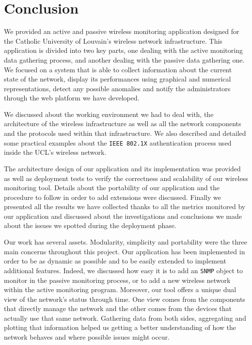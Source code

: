 
\chapter{Conclusion} %

\label{Chapter 7} %


We provided an active and passive wireless monitoring application designed for the Catholic University of Louvain's wireless network infrastructure. This application is divided into two key parts, one dealing with the active monitoring data gathering process, and another dealing with the passive data gathering one. We focused on a system that is able to collect information about the current state of the network, display its performances using graphical and numerical representations, detect any possible anomalies and notify the administrators through the web platform we have developed.

We discussed about the working environment we had to deal with, the architecture of the wireless infrastructure as well as all the network components and the protocols used within that infrastructure. We also described and detailed some practical examples about the \texttt{IEEE 802.1X} authentication process used inside the UCL's wireless network.

The architecture design of our application and its implementation was provided as well as deployment tests to verify the correctness and scalability of our wireless monitoring tool. Details about the portability of our application and the procedure to follow in order to add extensions were discussed.  Finally we presented all the results we have collected thanks to all the metrics monitored by our application and discussed about the investigations and conclusions we made about the issues we spotted during the deployment phase.

Our work has several assets. Modularity, simplicity and portability were the three main concerns throughout this project. Our application has been implemented in order to be as dynamic as possible and to be easily extended to implement additional features. Indeed, we discussed how easy it is to add an \texttt{SNMP} object to monitor in the passive monitoring process, or to add a new wireless network within the active monitoring program. Moreover, our tool offers a unique dual view of the network's status through time. One view comes from the components that directly manage the network and the other comes from the devices that actually use that same network. Gathering data from both sides, aggregating and plotting that information helped us getting a better understanding of how the network behaves and where possible issues might occur.


